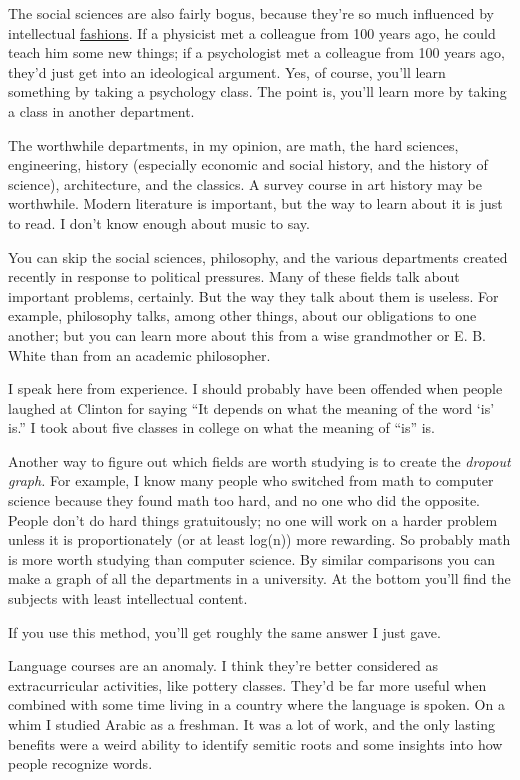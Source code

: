 The social sciences are also fairly bogus, because they're so much
influenced by intellectual \href{say.html}{fashions}. If a physicist met
a colleague from 100 years ago, he could teach him some new things; if a
psychologist met a colleague from 100 years ago, they'd just get into an
ideological argument. Yes, of course, you'll learn something by taking a
psychology class. The point is, you'll learn more by taking a class in
another department.

The worthwhile departments, in my opinion, are math, the hard sciences,
engineering, history (especially economic and social history, and the
history of science), architecture, and the classics. A survey course in
art history may be worthwhile. Modern literature is important, but the
way to learn about it is just to read. I don't know enough about music
to say.

You can skip the social sciences, philosophy, and the various
departments created recently in response to political pressures. Many of
these fields talk about important problems, certainly. But the way they
talk about them is useless. For example, philosophy talks, among other
things, about our obligations to one another; but you can learn more
about this from a wise grandmother or E. B. White than from an academic
philosopher.

I speak here from experience. I should probably have been offended when
people laughed at Clinton for saying ``It depends on what the meaning of
the word `is' is.'' I took about five classes in college on what the
meaning of ``is'' is.

Another way to figure out which fields are worth studying is to create
the \emph{dropout graph.} For example, I know many people who switched
from math to computer science because they found math too hard, and no
one who did the opposite. People don't do hard things gratuitously; no
one will work on a harder problem unless it is proportionately (or at
least log(n)) more rewarding. So probably math is more worth studying
than computer science. By similar comparisons you can make a graph of
all the departments in a university. At the bottom you'll find the
subjects with least intellectual content.

If you use this method, you'll get roughly the same answer I just gave.

Language courses are an anomaly. I think they're better considered as
extracurricular activities, like pottery classes. They'd be far more
useful when combined with some time living in a country where the
language is spoken. On a whim I studied Arabic as a freshman. It was a
lot of work, and the only lasting benefits were a weird ability to
identify semitic roots and some insights into how people recognize
words.


